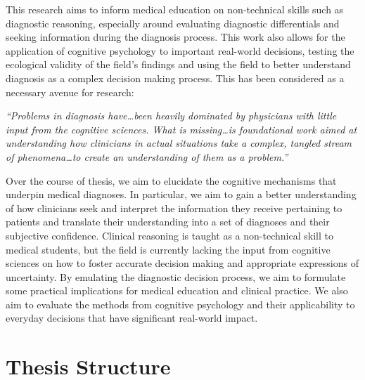 \documentclass[a4paper, nobind]{templates/ociamthesis}
\begin{document}
\hfill\break
This research aims to inform medical education on non-technical skills such as diagnostic reasoning, especially around evaluating diagnostic differentials and seeking information during the diagnosis process. This work also allows for the application of cognitive psychology to important real-world decisions, testing the ecological validity of the field's findings and using the field to better understand diagnosis as a complex decision making process. This has been considered as a necessary avenue for research:

\hfill\break
\emph{``Problems in diagnosis have\ldots been heavily dominated by physicians with little input from the cognitive sciences. What is missing\ldots is foundational work aimed at understanding how clinicians in actual situations take a complex, tangled stream of phenomena\ldots to create an understanding of them as a problem.''} \autocite{wears_diagnosing_2014}

\hfill\break
Over the course of thesis, we aim to elucidate the cognitive mechanisms that underpin medical diagnoses. In particular, we aim to gain a better understanding of how clinicians seek and interpret the information they receive pertaining to patients and translate their understanding into a set of diagnoses and their subjective confidence. Clinical reasoning is taught as a non-technical skill to medical students, but the field is currently lacking the input from cognitive sciences on how to foster accurate decision making and appropriate expressions of uncertainty. By emulating the diagnostic decision process, we aim to formulate some practical implications for medical education and clinical practice. We also aim to evaluate the methods from cognitive psychology and their applicability to everyday decisions that have significant real-world impact.

\newpage

\section*{Thesis Structure}\label{thesis-structure}
\end{document}
